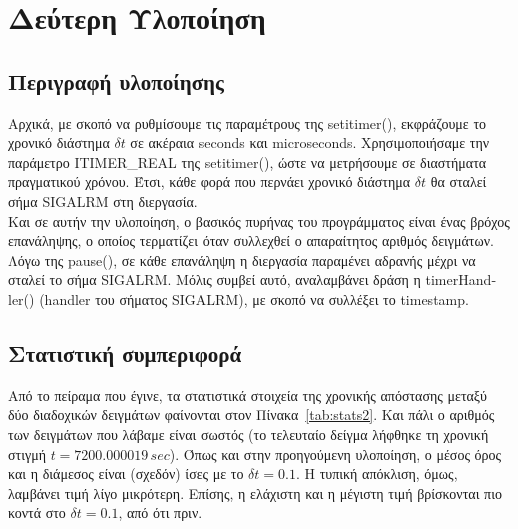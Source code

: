 \documentclass[a4paper,12pt]{article}
\begin{document}
\section{Δεύτερη Υλοποίηση} 

\subsection{Περιγραφή υλοποίησης}
Αρχικά, με σκοπό να ρυθμίσουμε τις παραμέτρους της \textlatin{setitimer()}, εκφράζουμε το χρονικό διάστημα $\delta t$ σε ακέραια \textlatin{seconds} και \textlatin{microseconds}. Χρησιμοποιήσαμε την παράμετρο \textlatin{ITIMER\_REAL} της \textlatin{setitimer()}, ώστε να μετρήσουμε σε διαστήματα πραγματικού χρόνου. Έτσι, κάθε φορά που περνάει χρονικό διάστημα $\delta t$ θα σταλεί σήμα \textlatin{SIGALRM} στη διεργασία. \\
Και σε αυτήν την υλοποίηση, ο βασικός πυρήνας του προγράμματος είναι ένας βρόχος επανάληψης, ο οποίος τερματίζει όταν συλλεχθεί ο απαραίτητος αριθμός δειγμάτων. Λόγω της \textlatin{pause()}, σε κάθε επανάληψη η διεργασία παραμένει αδρανής μέχρι να σταλεί το σήμα \textlatin{SIGALRM}. Μόλις συμβεί αυτό, αναλαμβάνει δράση η \textlatin{timerHandler()} (\textlatin{handler} του σήματος \textlatin{SIGALRM}), με σκοπό να συλλέξει το \textlatin{timestamp}.

\subsection{Στατιστική συμπεριφορά}


Από το πείραμα που έγινε, τα στατιστικά στοιχεία της χρονικής απόστασης μεταξύ δύο διαδοχικών δειγμάτων φαίνονται στον Πίνακα~\ref{tab:stats2}. Και πάλι ο αριθμός των δειγμάτων που λάβαμε είναι σωστός (το τελευταίο δείγμα λήφθηκε τη χρονική στιγμή $t = 7200.000019 \, sec$). Όπως και στην προηγούμενη υλοποίηση, ο μέσος όρος και η διάμεσος είναι (σχεδόν) ίσες με το $\delta t = 0.1$. Η τυπική απόκλιση, όμως, λαμβάνει τιμή λίγο μικρότερη. Επίσης, η ελάχιστη και η μέγιστη τιμή βρίσκονται πιο κοντά στο $\delta t = 0.1$, από ότι πριν. \\
\end{document}
